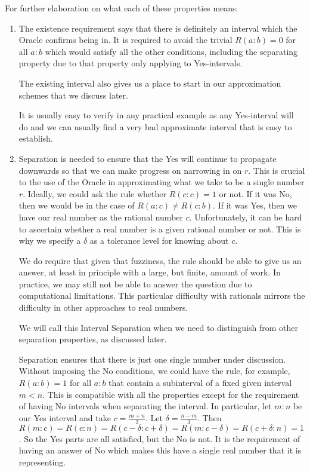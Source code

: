 \documentclass[12pt]{article}
\begin{document}
For further elaboration on what each of these properties means:

\begin{enumerate}
  
    \item The existence requirement says that there is definitely an interval which the Oracle confirms being in. It is required to avoid the trivial $R(a:b) = 0$ for all $a:b$ which would satisfy all the other conditions, including the separating property due to that property only applying to Yes-intervals. 
    
    The existing interval also gives us a place to start in our approximation schemes that we discuss later. 
    
    It is usually easy to verify in any practical example as any Yes-interval will do and we can usually find a very bad approximate interval that is easy to establish.  

    \item Separation is needed to ensure that the Yes will continue to propagate downwards so that we can make progress on narrowing in on $r$. This is crucial to the use of the Oracle in approximating what we take to be a single number $r$. Ideally, we could ask the rule whether $R(c:c) = 1$ or not. If it was No, then we would be in the case of $R(a:c) \neq R(c:b)$. If it was Yes, then we have our real number as the rational number $c$. Unfortunately, it can be hard to ascertain whether a real number is a given rational number or not. This is why we specify a $\delta$ as a tolerance level for knowing about $c$. 

    We do require that given that fuzziness, the rule should be able to give us an answer, at least in principle with a large, but finite, amount of work. In practice, we may still not be able to answer the question due to computational limitations. This particular difficulty with rationals mirrors the difficulty in other approaches to real numbers. 
    
    We will call this Interval Separation when we need to distinguish from other separation properties, as discussed later. 
    
    Separation ensures that there is just one single number under discussion. Without imposing the No conditions, we could have the rule, for example, $R(a:b) = 1$ for all $a:b$ that contain a subinterval of a fixed given interval $m \lt n$. This is compatible with all the properties except for the requirement of having No intervals when separating the interval. In particular, let $m:n$ be our Yes interval and take $c = \frac{m+n}{2}$. Let $\delta = \frac{n-m}{3}$. Then $R(m:c)=R(c:n)=R(c-\delta:c+\delta)=R(m:c-\delta)=R(c+\delta:n) = 1$. So the Yes parts are all satisfied, but the No is not. It is the requirement of having an answer of No which makes this have a single real number that it is representing.


\end{enumerate}
\end{document}
